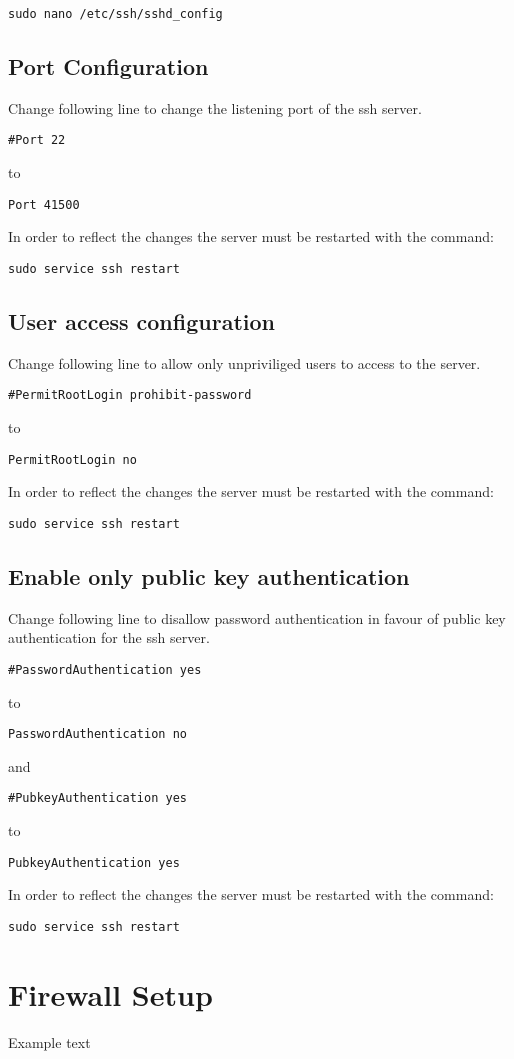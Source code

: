 \documentclass[10pt,a4paper]{article}
\begin{document}
\begin{verbatim}
sudo nano /etc/ssh/sshd_config
\end{verbatim}

\subsection{Port Configuration}
Change following line to change the listening port of the ssh server.

\begin{verbatim}
#Port 22
\end{verbatim}
to
\begin{verbatim}
Port 41500
\end{verbatim}

In order to reflect the changes the server must be restarted with the command:
\begin{verbatim}
sudo service ssh restart
\end{verbatim}

\subsection{User access configuration}
Change following line to allow only unpriviliged users to access to the server.

\begin{verbatim}
#PermitRootLogin prohibit-password
\end{verbatim}
to
\begin{verbatim}
PermitRootLogin no
\end{verbatim}

In order to reflect the changes the server must be restarted with the command:
\begin{verbatim}
sudo service ssh restart
\end{verbatim}

\subsection{Enable only public key authentication}
Change following line to disallow password authentication in favour of public key authentication for the ssh server.

\begin{verbatim}
#PasswordAuthentication yes
\end{verbatim}
to
\begin{verbatim}
PasswordAuthentication no
\end{verbatim}
and
\begin{verbatim}
#PubkeyAuthentication yes
\end{verbatim}
to
\begin{verbatim}
PubkeyAuthentication yes
\end{verbatim}

In order to reflect the changes the server must be restarted with the command:
\begin{verbatim}
sudo service ssh restart
\end{verbatim}

\newpage
\section{Firewall Setup}
Example text
\end{document}
